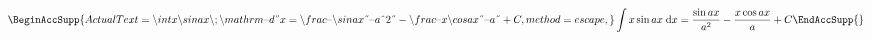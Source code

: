 \documentclass{article}%
\newcommand*{\copyable}[1]{%
\BeginAccSupp{%
ActualText=\detokenize{#1},%
method=escape,
}%
#1%
\EndAccSupp{}%
}
\begin{document}
%
\[
\copyable{\int x\sin ax\;\mathrm{d}x = \frac{\sin ax}{a^2}-\frac{x\cos ax}%
{a}+C}
\]%
\end{document}
